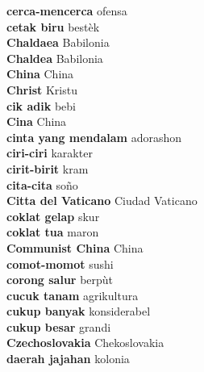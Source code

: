 \textbf{ cerca-mencerca  } ofensa \\
\textbf{ cetak biru  } bestèk \\
\textbf{ Chaldaea  } Babilonia \\
\textbf{ Chaldea  } Babilonia \\
\textbf{ China  } China \\
\textbf{ Christ  } Kristu \\
\textbf{ cik adik  } bebi \\
\textbf{ Cina  } China \\
\textbf{ cinta yang mendalam  } adorashon \\
\textbf{ ciri-ciri  } karakter \\
\textbf{ cirit-birit  } kram \\
\textbf{ cita-cita  } soño \\
\textbf{ Citta del Vaticano  } Ciudad Vaticano \\
\textbf{ coklat gelap  } skur \\
\textbf{ coklat tua  } maron \\
\textbf{ Communist China  } China \\
\textbf{ comot-momot  } sushi \\
\textbf{ corong salur  } berpùt \\
\textbf{ cucuk tanam  } agrikultura \\
\textbf{ cukup banyak  } konsiderabel \\
\textbf{ cukup besar  } grandi \\
\textbf{ Czechoslovakia  } Chekoslovakia \\
\textbf{ daerah jajahan  } kolonia \\
